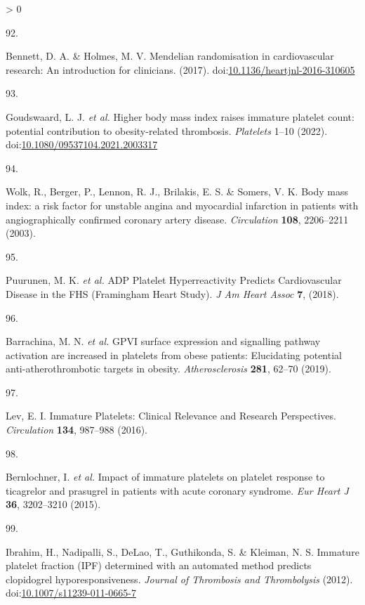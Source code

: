 \documentclass[11pt,twoside]{bristolthesis}
\newlength{\cslhangindent}
\newlength{\csllabelwidth}
\newenvironment{CSLReferences}[2] %
 {%
  \setlength{\parindent}{0pt}
  \ifodd #1 \everypar{\setlength{\hangindent}{\cslhangindent}}\ignorespaces\fi
  \ifnum #2 > 0
  \setlength{\parskip}{#2\baselineskip}
  \fi
 }%
 {}
\newcommand{\CSLLeftMargin}[1]{\parbox[t]{\csllabelwidth}{#1}}
\newcommand{\CSLRightInline}[1]{\parbox[t]{\linewidth - \csllabelwidth}{#1}\break}
\begin{document}
\begin{CSLReferences}{0}{0}
\leavevmode\hypertarget{ref-Bennett2017}{}%
\CSLLeftMargin{92. }
\CSLRightInline{Bennett, D. A. \& Holmes, M. V. {Mendelian randomisation in cardiovascular research: An introduction for clinicians}. (2017). doi:\href{https://doi.org/10.1136/heartjnl-2016-310605}{10.1136/heartjnl-2016-310605}}

\leavevmode\hypertarget{ref-Goudswaard2022}{}%
\CSLLeftMargin{93. }
\CSLRightInline{Goudswaard, L. J. \emph{et al.} {Higher body mass index raises immature platelet count: potential contribution to obesity-related thrombosis}. \emph{Platelets} 1--10 (2022). doi:\href{https://doi.org/10.1080/09537104.2021.2003317}{10.1080/09537104.2021.2003317}}

\leavevmode\hypertarget{ref-Wolk2003a}{}%
\CSLLeftMargin{94. }
\CSLRightInline{Wolk, R., Berger, P., Lennon, R. J., Brilakis, E. S. \& Somers, V. K. {Body mass index: a risk factor for unstable angina and myocardial infarction in patients with angiographically confirmed coronary artery disease}. \emph{Circulation} \textbf{108}, 2206--2211 (2003).}

\leavevmode\hypertarget{ref-Puurunen2018}{}%
\CSLLeftMargin{95. }
\CSLRightInline{Puurunen, M. K. \emph{et al.} {ADP Platelet Hyperreactivity Predicts Cardiovascular Disease in the FHS (Framingham Heart Study)}. \emph{J Am Heart Assoc} \textbf{7}, (2018).}

\leavevmode\hypertarget{ref-Barrachina2019}{}%
\CSLLeftMargin{96. }
\CSLRightInline{Barrachina, M. N. \emph{et al.} {GPVI surface expression and signalling pathway activation are increased in platelets from obese patients: Elucidating potential anti-atherothrombotic targets in obesity}. \emph{Atherosclerosis} \textbf{281}, 62--70 (2019).}

\leavevmode\hypertarget{ref-Lev2016a}{}%
\CSLLeftMargin{97. }
\CSLRightInline{Lev, E. I. {Immature Platelets: Clinical Relevance and Research Perspectives}. \emph{Circulation} \textbf{134}, 987--988 (2016).}

\leavevmode\hypertarget{ref-Bernlochner2015a}{}%
\CSLLeftMargin{98. }
\CSLRightInline{Bernlochner, I. \emph{et al.} {Impact of immature platelets on platelet response to ticagrelor and prasugrel in patients with acute coronary syndrome}. \emph{Eur Heart J} \textbf{36}, 3202--3210 (2015).}

\leavevmode\hypertarget{ref-Ibrahim2012}{}%
\CSLLeftMargin{99. }
\CSLRightInline{Ibrahim, H., Nadipalli, S., DeLao, T., Guthikonda, S. \& Kleiman, N. S. {Immature platelet fraction (IPF) determined with an automated method predicts clopidogrel hyporesponsiveness}. \emph{Journal of Thrombosis and Thrombolysis} (2012). doi:\href{https://doi.org/10.1007/s11239-011-0665-7}{10.1007/s11239-011-0665-7}}


\end{CSLReferences}
\end{document}
